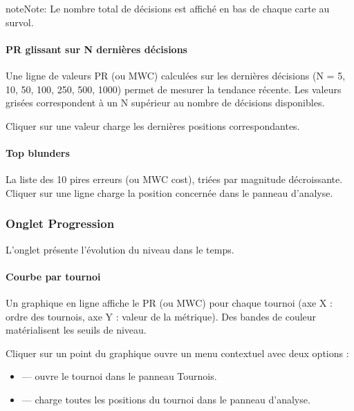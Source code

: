 \documentclass[letterpaper,10pt,french]{sphinxmanual}
\begin{document}
\begin{sphinxadmonition}{note}{Note:}
\sphinxAtStartPar
Le nombre total de décisions est affiché en bas de chaque carte au survol.
\end{sphinxadmonition}


\paragraph{PR glissant sur N dernières décisions}
\label{\detokenize{manuel:pr-glissant-sur-n-dernieres-decisions}}
\sphinxAtStartPar
Une ligne de valeurs PR (ou MWC) calculées sur les  dernières décisions
(N = 5, 10, 50, 100, 250, 500, 1000) permet de mesurer la tendance récente.
Les valeurs grisées correspondent à un N supérieur au nombre de décisions
disponibles.

\sphinxAtStartPar
Cliquer sur une valeur charge les  dernières positions correspondantes.


\paragraph{Top blunders}
\label{\detokenize{manuel:top-blunders}}
\sphinxAtStartPar
La liste des 10 pires erreurs (ou MWC cost), triées par magnitude décroissante.
Cliquer sur une ligne charge la position concernée dans le panneau d’analyse.


\subsubsection{Onglet Progression}
\label{\detokenize{manuel:onglet-progression}}
\sphinxAtStartPar
L’onglet  présente l’évolution du niveau dans le temps.


\paragraph{Courbe par tournoi}
\label{\detokenize{manuel:courbe-par-tournoi}}
\sphinxAtStartPar
Un graphique en ligne affiche le PR (ou MWC) pour chaque tournoi (axe X :
ordre des tournois, axe Y : valeur de la métrique). Des bandes de couleur
matérialisent les seuils de niveau.

\sphinxAtStartPar
Cliquer sur un point du graphique ouvre un menu contextuel avec deux options :
\begin{itemize}
\item {} 
\sphinxAtStartPar
{} — ouvre le tournoi dans le panneau Tournois.

\item {} 
\sphinxAtStartPar
{} — charge toutes les positions du tournoi dans le panneau
d’analyse.

\end{itemize}
\end{document}
